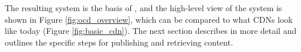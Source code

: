 
The resulting system is the basis of \system{}, and the high-level view of the system is shown in Figure \ref{fig:ocd_overview}, 
which can be compared to what CDNs look like today (Figure \ref{fig:basic_cdn}).  The next section describes \system{} in more 
detail and outlines the specific steps for publishing and retrieving content.

